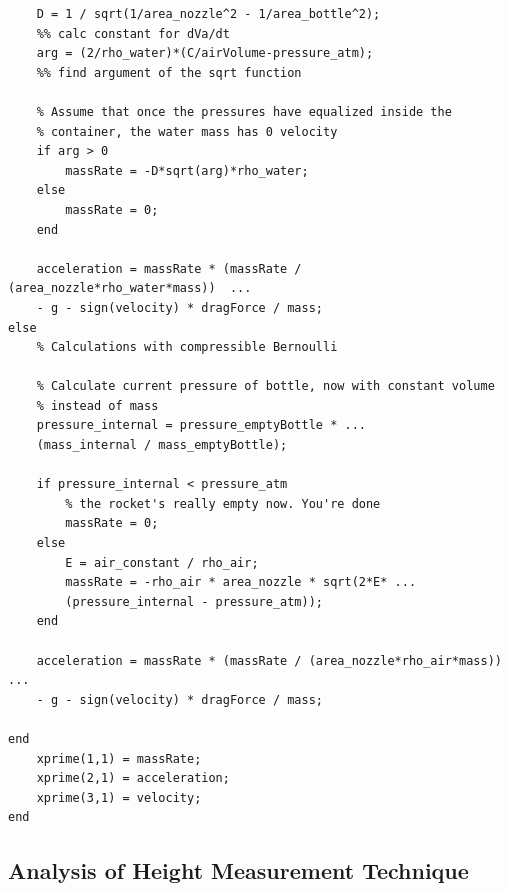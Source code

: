 \documentclass[12pt]{article}
\begin{document}
\begin{verbatim}
    D = 1 / sqrt(1/area_nozzle^2 - 1/area_bottle^2); 
    %% calc constant for dVa/dt
    arg = (2/rho_water)*(C/airVolume-pressure_atm); 
    %% find argument of the sqrt function

    % Assume that once the pressures have equalized inside the
    % container, the water mass has 0 velocity
    if arg > 0
        massRate = -D*sqrt(arg)*rho_water;
    else
        massRate = 0;
    end
    
    acceleration = massRate * (massRate / (area_nozzle*rho_water*mass))  ...
    - g - sign(velocity) * dragForce / mass;
else
    % Calculations with compressible Bernoulli
    
    % Calculate current pressure of bottle, now with constant volume
    % instead of mass
    pressure_internal = pressure_emptyBottle * ...
    (mass_internal / mass_emptyBottle);
    
    if pressure_internal < pressure_atm
        % the rocket's really empty now. You're done
        massRate = 0;
    else
        E = air_constant / rho_air;
        massRate = -rho_air * area_nozzle * sqrt(2*E* ...
        (pressure_internal - pressure_atm));
    end
    
    acceleration = massRate * (massRate / (area_nozzle*rho_air*mass))  ...
    - g - sign(velocity) * dragForce / mass;

end
    xprime(1,1) = massRate;
    xprime(2,1) = acceleration;
    xprime(3,1) = velocity;
end
  \end{verbatim}
  
  \subsection{Analysis of Height Measurement Technique}
\end{document}
